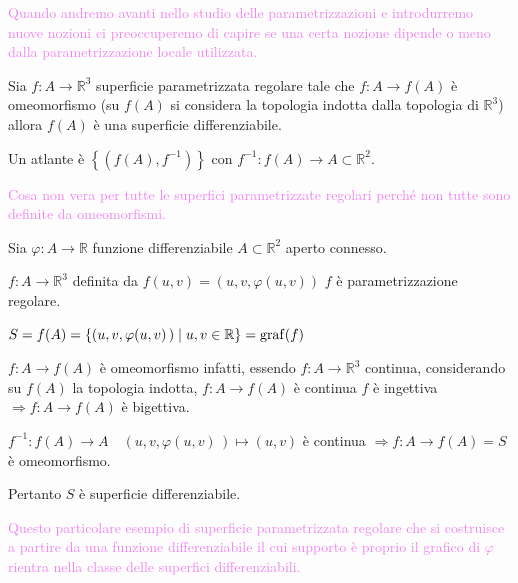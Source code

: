         \newpage
        \textcolor{violet}{Quando andremo avanti nello studio delle parametrizzazioni e introdurremo nuove nozioni ci preoccuperemo di capire se una certa nozione dipende o meno
        dalla parametrizzazione locale utilizzata.}
        \begin{esempio}
        Sia $f \colon A \to \mathbb{R}^3$ superficie parametrizzata regolare tale che $f \colon A \to f(A)$ è omeomorfismo 
        \textcolor{blu}{(su $f(A)$ si considera la topologia indotta dalla topologia di $\mathbb{R}^3$)}
        allora $f(A)$ è una superficie differenziabile.

        Un atlante è $\left\{\left(f(A), f^{-1}\right)\right\}$ con $f^{-1} \colon f(A) \to A \subset \mathbb{R}^2$.

        \textcolor{violet}{Cosa non vera per tutte le superfici parametrizzate regolari perché non tutte sono definite da omeomorfismi.}
        \end{esempio}
        \begin{esempio}
        \label{esempio:grafico_funzione_superficie_2}
        \mbox{}

        Sia $\varphi \colon A \to \mathbb{R}$ funzione differenziabile $A \subset \mathbb{R}^2$ aperto connesso.

        $f \colon A \to \mathbb{R}^3$ definita da $f(u, v) = (u, v, \varphi(u, v))$ $f$ è parametrizzazione regolare.
        
        $S = f(A)= \left\{ \left(u,v, \varphi(u,v) \, \right) \mid u,v \in \mathbb{R} \right\}= \operatorname{graf}(f)$

        $f \colon A \to f(A)$ è omeomorfismo infatti, essendo $f \colon A \to \mathbb{R}^3$ continua, considerando su $f(A)$ la topologia indotta, $f \colon A \to f(A)$ è continua
        $f$ è \textcolor{amber}{ingettiva} $\Rightarrow f \colon A \to f(A)$ è bigettiva.

        $f^{-1} \colon f(A) \to A \quad \left(u,v, \varphi(u,v) \,\right) \mapsto (u,v)$ è continua $\Rightarrow f \colon A \to f(A)=S$ è omeomorfismo.

        Pertanto $S$ è superficie differenziabile.

        \textcolor{violet}{Questo particolare esempio di superficie parametrizzata regolare che si costruisce a partire da una funzione differenziabile
        il cui supporto è proprio il grafico di $\varphi$ rientra nella classe delle superfici differenziabili.}
        \end{esempio}
